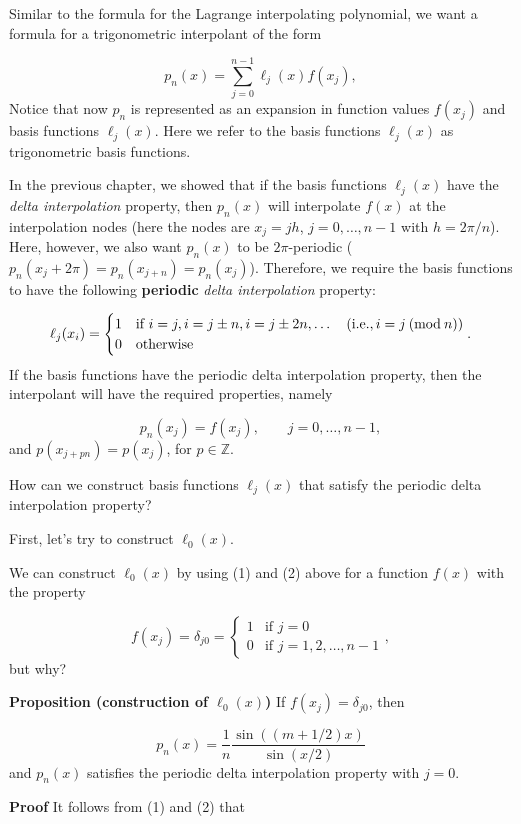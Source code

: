 \documentclass[12pt,a4paper]{article}
\begin{document}
Similar to the formula for the Lagrange interpolating polynomial, we want a formula for a trigonometric interpolant of the form

\[
p_n(x) = \sum_{j=0}^{n-1}\ell_{j}(x) f(x_{j}),
\]
Notice that now $p_n$ is represented as an expansion in function values $f(x_{j})$ and basis functions $\ell_{j}(x)$.  Here we refer to the basis functions $\ell_{j}(x)$ as trigonometric basis functions.

In the previous chapter, we showed that if the basis functions $\ell_{j}(x)$ have the \emph{delta interpolation} property, then $p_n(x)$ will interpolate $f(x)$ at the interpolation nodes (here the nodes are $x_j = jh$, $j = 0, \ldots, n-1$ with $h = 2\pi/n$).  Here, however, we also want $p_n(x)$ to be $2\pi$-periodic ($p_n(x_j+2\pi) = p_n(x_{j+n}) = p_n(x_j)$).  Therefore, we  require the basis functions to have the following \textbf{periodic} \emph{delta interpolation} property:

\[
\ell_{j}(x_i) = \begin{cases}
1 & \text{if } i = j, i = j \pm n, i = j \pm 2n, \ldots \quad (\text{i.e.}, i = j\: ({\rm mod}\: n))  \\
0 & \text{otherwise } 
\end{cases}.
\]
If the basis functions have the periodic delta interpolation property, then the interpolant will have the required properties, namely

\[
p_n(x_{j}) = f(x_{j}), \qquad j = 0, \ldots, n - 1,
\]
and $p(x_{j + pn}) = p(x_{j})$, for $p \in \mathbb{Z}$.

How can we construct basis functions $\ell_{j}(x)$ that satisfy the periodic delta interpolation property?

First, let's try to construct $\ell_0(x)$.  

We can construct $\ell_0(x)$ by using (1) and (2) above for a function $f(x)$ with the property 

\[
f(x_j) = \delta_{j0} = \begin{cases}
1 & \text{if } j = 0 \\
0 & \text{if } j = 1, 2, \ldots, n - 1
\end{cases},
\]
but why?

\textbf{Proposition (construction of $\ell_0(x)$)} If $f(x_j) = \delta_{j0}$, then 

\[
p_n(x) = \frac{1}{n}\frac{\sin((m+1/2)x)}{\sin(x/2)}
\]
and $p_n(x)$ satisfies the periodic delta interpolation property with $j = 0$.

\textbf{Proof} It follows from (1) and (2) that
\end{document}
